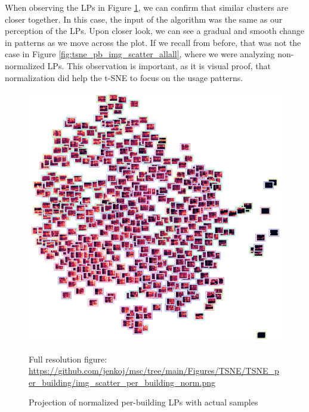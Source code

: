 When observing the LPs in Figure \ref{fig:tsne_pb_img_norm_scatter_allall}, we can confirm that similar clusters are closer together.
In this case, the input of the algorithm was the same as our perception of the LPs.
Upon closer look, we can see a gradual and smooth change in patterns as we move across the plot.
If we recall from before, that was not the case in Figure \ref{fig:tsne_pb_img_scatter_allall}, where we were analyzing non-normalized LPs.
This observation is important, as it is visual proof, that normalization did help the t-SNE to focus on the usage patterns.

\begin{figure}[H]
	\centering
	\caption{Projection of normalized per-building LPs with actual samples}
	\includegraphics[width=.9\textwidth]{Figures/TSNE/TSNE_per_building/img_scatter_per_building_norm.png}
	\label{fig:tsne_pb_img_norm_scatter_allall}
	\par
	\par\footnotesize{Full resolution figure: \url{https://github.com/jenkoj/msc/tree/main/Figures/TSNE/TSNE_per_building/img_scatter_per_building_norm.png}}
\end{figure}


